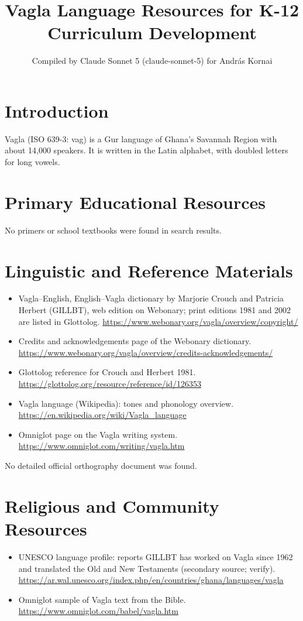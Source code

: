 \documentclass[12pt]{article}
\title{Vagla Language Resources for K-12 Curriculum Development}
\author{Compiled by Claude Sonnet 5 (claude-sonnet-5) for Andr\'as Kornai}
\date{}
\begin{document}
\maketitle
\section{Introduction}
Vagla (ISO 639-3: vag) is a Gur language of Ghana's Savannah Region with about 14,000 speakers. It is written in the Latin alphabet, with doubled letters for long vowels.
\section{Primary Educational Resources}
No primers or school textbooks were found in search results.
\section{Linguistic and Reference Materials}
\begin{itemize}
\item Vagla--English, English--Vagla dictionary by Marjorie Crouch and Patricia Herbert (GILLBT), web edition on Webonary; print editions 1981 and 2002 are listed in Glottolog. \url{https://www.webonary.org/vagla/overview/copyright/}
\item Credits and acknowledgements page of the Webonary dictionary. \url{https://www.webonary.org/vagla/overview/credits-acknowledgements/}
\item Glottolog reference for Crouch and Herbert 1981. \url{https://glottolog.org/resource/reference/id/126353}
\item Vagla language (Wikipedia): tones and phonology overview. \url{https://en.wikipedia.org/wiki/Vagla_language}
\item Omniglot page on the Vagla writing system. \url{https://www.omniglot.com/writing/vagla.htm}
\end{itemize}
No detailed official orthography document was found.
\section{Religious and Community Resources}
\begin{itemize}
\item UNESCO language profile: reports GILLBT has worked on Vagla since 1962 and translated the Old and New Testaments (secondary source; verify). \url{https://ar.wal.unesco.org/index.php/en/countries/ghana/languages/vagla}
\item Omniglot sample of Vagla text from the Bible. \url{https://www.omniglot.com/babel/vagla.htm}
\end{itemize}
\end{document}
